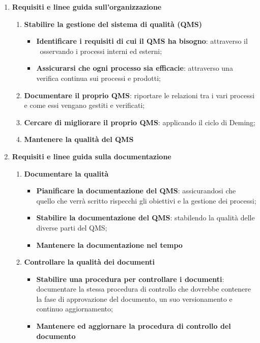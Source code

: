 	\begin{enumerate}
		\item \textbf{Requisiti e linee guida sull'organizzazione}
		\begin{enumerate}
			\item \textbf{Stabilire la gestione del sistema di qualità (QMS)}
			\begin{itemize}
				\item \textbf{Identificare i requisiti di cui il QMS ha bisogno}: attraverso il \PdQ~osservando i processi interni ed esterni;
				\item \textbf{Assicurarsi che ogni processo sia efficacie}: attraverso una verifica continua sui processi e prodotti;
			\end{itemize}
			\item \textbf{Documentare il proprio QMS}: riportare le relazioni tra i vari processi e come essi vengano gestiti e verificati;
			\item \textbf{Cercare di migliorare il proprio QMS}: applicando il ciclo di Deming;
			\item \textbf{Mantenere la qualità del QMS}
		\end{enumerate} 
		
		\item \textbf{Requisiti e linee guida sulla documentazione}
		\begin{enumerate}
			\item \textbf{Documentare la qualità}
			\begin{itemize}
				\item \textbf{Pianificare la documentazione del QMS}: assicurandosi che quello che verrà scritto rispecchi gli obiettivi e la gestione dei processi;
				\item \textbf{Stabilire la documentazione del QMS}: stabilendo la qualità delle diverse parti del QMS;
				\item \textbf{Mantenere la documentazione nel tempo}
			\end{itemize}
			
			\item \textbf{Controllare la qualità dei documenti}
			\begin{itemize}
				\item \textbf{Stabilire una procedura per controllare i documenti}: documentare la stessa procedura di controllo che dovrebbe contenere la fase di approvazione del documento, un suo versionamento e continuo aggiornamento;
				\item \textbf{Mantenere ed aggiornare la procedura di controllo del documento}
			\end{itemize}
		\end{enumerate}
	\end{enumerate}

